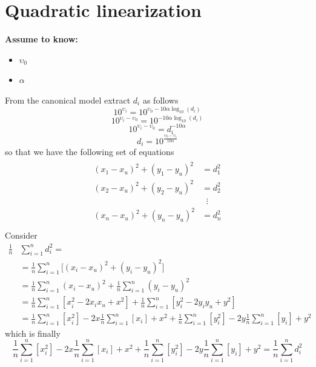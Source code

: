 \documentclass[12pt,twoside]{report}
\begin{document}
\section{Quadratic linearization}
  \begin{center}
  \textbf{Assume to know:}
  \begin{itemize}
    \centering
    \item $\upsilon_0$
    \item $\alpha$
  \end{itemize}
  \end{center}
From the canonical model extract $d_i$ as follows
\begin{equation*}
    10^{\upsilon_{i}}=10^{\upsilon_0-10\alpha\log_{10}(d_i)}
\end{equation*}
\begin{equation*}
    10^{\upsilon_{i}-\upsilon_0}=10^{-10\alpha\log_{10}(d_i)}
\end{equation*}
\begin{equation*}
     10^{\upsilon_{i}-\upsilon_0}=d_i^{-10\alpha}
\end{equation*}
\begin{equation}
    d_i=10^{\frac{\upsilon_0-\upsilon_{i}}{10\alpha}}
    \label{eq:17}
\end{equation}
so that we have the following set of equations
\begin{align}
\begin{split} 
(x_1-x_u)^2+(y_1-y_u)^2&=d_1^2 \\ 
(x_2-x_u)^2+(y_2-y_u)^2&=d_2^2 \\ 
&\;\;\vdots\\
(x_n-x_u)^2+(y_n-y_u)^2&=d_n^2 \\
\end{split}
\label{eq:11}
\end{align}
Consider 
\begin{align}
\frac{1}{n}&\sum_{i=1}^nd_i^2=\\
&=\frac{1}{n}\sum_{i=1}^n\big[(x_i-x_u)^2+(y_i-y_u)^2\big]\\
&=\frac{1}{n}\sum_{i=1}^n(x_i-x_u)^2+\frac{1}{n}\sum_{i=1}^n(y_i-y_u)^2\\
&=\frac{1}{n}\sum_{i=1}^n[x_i^2-2x_ix_u+x^2] + \frac{1}{n}\sum_{i=1}^n[y_i^2-2y_iy_u+y^2]\\
&=\frac{1}{n}\sum_{i=1}^n[x_i^2]-2x\frac{1}{n}\sum_{i=1}^n[x_i]+ x^2 + \frac{1}{n}\sum_{i=1}^n[y_i^2]-2y\frac{1}{n}\sum_{i=1}^n[y_i]+ y^2
\end{align}
which is finally
\begin{equation}
    \frac{1}{n}\sum_{i=1}^n[x_i^2]-2x\frac{1}{n}\sum_{i=1}^n[x_i]+ x^2 + \frac{1}{n}\sum_{i=1}^n[y_i^2]-2y\frac{1}{n}\sum_{i=1}^n[y_i]+ y^2= \frac{1}{n}\sum_{i=1}^nd_i^2
    \label{eq:12}
\end{equation}
\end{document}
